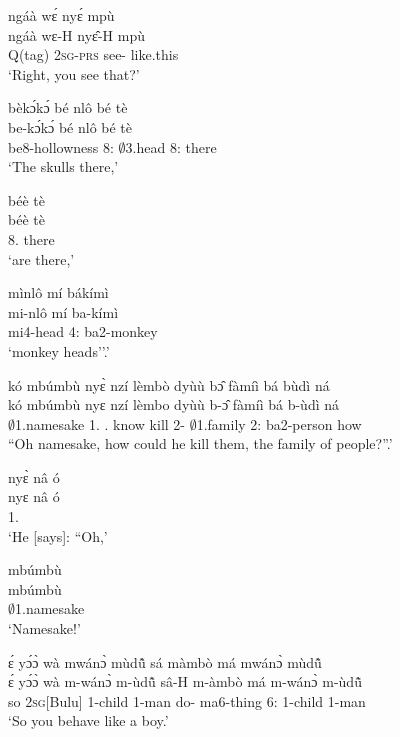 \begin{exe}[(N234)]
\exN\label{n132}
  \glll ngáà wɛ́ nyɛ́ mpù \\
       ngáà wɛ-H nyɛ̂-H mpù \\
       Q(tag) 2\textsc{sg}-\textsc{prs} see-{\R} like.this  \\
    \trans `Right, you see that?'
 
\exN\label{n133}
  \glll bèkɔ́kɔ́ bé nlô bé tè \\
       be-kɔ́kɔ́ bé nlô bé tè \\
        be8-hollowness 8:{\ATT}  $\emptyset$3.head 8:{\ATT}  there \\
    \trans `The skulls there,'
 
\exN\label{n134}
  \glll béè tè \\
        béè tè \\
        8.{\COP} there\\
    \trans `are there,'
 
\exN\label{n135}
  \glll mìnlô mí bákímì \\
        mi-nlô mí ba-kímì \\
       mi4-head 4:{\ATT}  ba2-monkey  \\
    \trans `monkey heads''.'
 
\exN\label{n136}
  \glll kó mbúmbù nyɛ̀ nzí lèmbò dyùù bɔ̂ fàmíì bá bùdì ná \\
       kó mbúmbù nyɛ nzí lèmbo dyùù b-ɔ̂ fàmíì bá b-ùdì ná \\
       {\EXCL} $\emptyset$1.namesake 1.{\SBJ}  {\PROG}.{\PST}  know kill 2-{\OBJ} $\emptyset$1.family 2:{\ATT}  ba2-person how \\
    \trans ``Oh namesake, how could he kill them, the family of people?''.'
 
\exN\label{n137}
  \glll nyɛ̀ nâ ó \\
        nyɛ nâ ó \\
        1.{\SBJ}  {\COMP} {\EXCL} \\
    \trans `He [says]: ``Oh,'
 
\exN\label{n138}
  \glll mbúmbù \\
       mbúmbù \\
       $\emptyset$1.namesake  \\
    \trans `Namesake!'
 
\exN\label{n139}
  \glll ɛ́ yɔ́ɔ̀ wà mwánɔ̀ mùdũ̂ sá màmbò má mwánɔ̀ mùdũ̂ \\
      ɛ́ yɔ́ɔ̀ wà m-wánɔ̀ m-ùdũ̂ sâ-H m-àmbò má m-wánɔ̀ m-ùdũ̂ \\
       {\LOC} so 2\textsc{sg}[Bulu] {\N}1-child {\N}1-man do-{\R} ma6-thing 6:{\ATT}  {\N}1-child {\N}1-man  \\
    \trans `So you behave like a boy.'
 

\end{exe}
